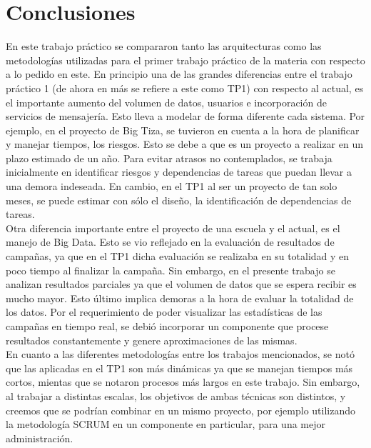 \section{Conclusiones}

En este trabajo práctico se compararon tanto las arquitecturas como las metodologías utilizadas para el primer trabajo práctico de la materia con respecto a lo pedido en este.
En principio una de las grandes diferencias entre el trabajo práctico 1 (de ahora en más se refiere a este como TP1) con respecto al actual, es el importante aumento del volumen de datos, usuarios e incorporación de servicios de mensajería. 
Esto lleva a modelar de forma diferente cada sistema. Por ejemplo, en el proyecto de Big Tiza, se tuvieron en cuenta a la hora de planificar y manejar tiempos, los riesgos. Esto se debe a que es un proyecto a realizar en un plazo estimado de un año. Para evitar atrasos no contemplados, se trabaja inicialmente en identificar riesgos y dependencias de tareas que puedan llevar a una demora indeseada. En cambio, en el TP1 al ser un proyecto de tan solo meses, se puede estimar con sólo el diseño, la identificación de dependencias de tareas. \\
Otra diferencia importante entre el proyecto de una escuela y el actual, es el manejo de Big Data. Esto se vio reflejado en la evaluación de resultados de campañas, ya que en el TP1 dicha evaluación se realizaba en su totalidad y en poco tiempo al finalizar la campaña. Sin embargo, en el presente trabajo se analizan resultados parciales ya que el volumen de datos que se espera recibir es mucho mayor. Esto último implica demoras a la hora de evaluar la totalidad de los datos. Por el requerimiento de poder visualizar las estadísticas de las campañas en tiempo real, se debió incorporar un componente que procese resultados constantemente y genere aproximaciones de las mismas. \\
En cuanto a las diferentes metodologías entre los trabajos mencionados, se notó que las aplicadas en el TP1 son más dinámicas ya que se manejan tiempos más cortos, mientas que se notaron procesos más largos en este trabajo. Sin embargo, al trabajar a distintas escalas, los objetivos de ambas t\'ecnicas son distintos, y creemos que se podrían combinar en un mismo proyecto, por ejemplo utilizando la metodología SCRUM en un componente en particular, para una mejor administraci\'on.

